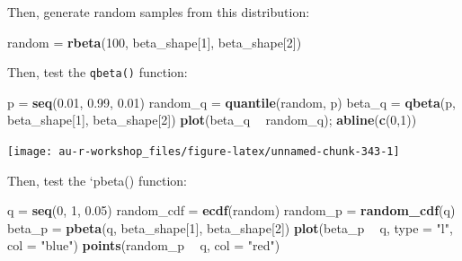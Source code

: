 \documentclass[]{book}
\newenvironment{Shaded}{\begin{snugshade}}{\end{snugshade}}
\newcommand{\KeywordTok}[1]{\textcolor[rgb]{0.13,0.29,0.53}{\textbf{#1}}}
\newcommand{\DataTypeTok}[1]{\textcolor[rgb]{0.13,0.29,0.53}{#1}}
\newcommand{\DecValTok}[1]{\textcolor[rgb]{0.00,0.00,0.81}{#1}}
\newcommand{\FloatTok}[1]{\textcolor[rgb]{0.00,0.00,0.81}{#1}}
\newcommand{\StringTok}[1]{\textcolor[rgb]{0.31,0.60,0.02}{#1}}
\newcommand{\OperatorTok}[1]{\textcolor[rgb]{0.81,0.36,0.00}{\textbf{#1}}}
\newcommand{\NormalTok}[1]{#1}
\theoremstyle{definition}
\theoremstyle{definition}
\theoremstyle{definition}
\theoremstyle{remark}
\begin{document}
Then, generate random samples from this distribution:

\begin{Shaded}
\begin{Highlighting}[]
\NormalTok{random =}\StringTok{ }\KeywordTok{rbeta}\NormalTok{(}\DecValTok{100}\NormalTok{, beta_shape[}\DecValTok{1}\NormalTok{], beta_shape[}\DecValTok{2}\NormalTok{])}
\end{Highlighting}
\end{Shaded}

Then, test the \texttt{qbeta()} function:

\begin{Shaded}
\begin{Highlighting}[]
\NormalTok{p =}\StringTok{ }\KeywordTok{seq}\NormalTok{(}\FloatTok{0.01}\NormalTok{, }\FloatTok{0.99}\NormalTok{, }\FloatTok{0.01}\NormalTok{)}
\NormalTok{random_q =}\StringTok{ }\KeywordTok{quantile}\NormalTok{(random, p)}
\NormalTok{beta_q =}\StringTok{ }\KeywordTok{qbeta}\NormalTok{(p, beta_shape[}\DecValTok{1}\NormalTok{], beta_shape[}\DecValTok{2}\NormalTok{])}
\KeywordTok{plot}\NormalTok{(beta_q }\OperatorTok{~}\StringTok{ }\NormalTok{random_q); }\KeywordTok{abline}\NormalTok{(}\KeywordTok{c}\NormalTok{(}\DecValTok{0}\NormalTok{,}\DecValTok{1}\NormalTok{))}
\end{Highlighting}
\end{Shaded}

\begin{center}\texttt{[image: au-r-workshop\_files/figure-latex/unnamed-chunk-343-1]} \end{center}

Then, test the `pbeta() function:

\begin{Shaded}
\begin{Highlighting}[]
\NormalTok{q =}\StringTok{ }\KeywordTok{seq}\NormalTok{(}\DecValTok{0}\NormalTok{, }\DecValTok{1}\NormalTok{, }\FloatTok{0.05}\NormalTok{)}
\NormalTok{random_cdf =}\StringTok{ }\KeywordTok{ecdf}\NormalTok{(random)}
\NormalTok{random_p =}\StringTok{ }\KeywordTok{random_cdf}\NormalTok{(q)}
\NormalTok{beta_p =}\StringTok{ }\KeywordTok{pbeta}\NormalTok{(q, beta_shape[}\DecValTok{1}\NormalTok{], beta_shape[}\DecValTok{2}\NormalTok{])}
\KeywordTok{plot}\NormalTok{(beta_p }\OperatorTok{~}\StringTok{ }\NormalTok{q, }\DataTypeTok{type =} \StringTok{"l"}\NormalTok{, }\DataTypeTok{col =} \StringTok{"blue"}\NormalTok{)}
\KeywordTok{points}\NormalTok{(random_p }\OperatorTok{~}\StringTok{ }\NormalTok{q, }\DataTypeTok{col =} \StringTok{"red"}\NormalTok{)}
\end{Highlighting}
\end{Shaded}
\end{document}
